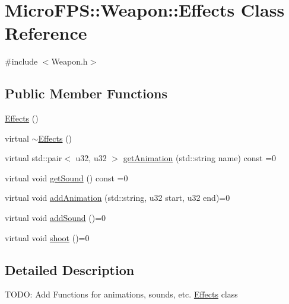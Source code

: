 \hypertarget{class_micro_f_p_s_1_1_weapon_1_1_effects}{
\section{MicroFPS::Weapon::Effects Class Reference}
\label{df/d54/class_micro_f_p_s_1_1_weapon_1_1_effects}
}


{\ttfamily \#include $<$Weapon.h$>$}

\subsection*{Public Member Functions}
\begin{DoxyCompactItemize}
\item 
\hyperlink{class_micro_f_p_s_1_1_weapon_1_1_effects_a07511011cd19c8919d20bdc7d6c48565}{Effects} ()
\item 
virtual \hyperlink{class_micro_f_p_s_1_1_weapon_1_1_effects_a55df57e8c918617e7d7b7c5630a3b9fd}{$\sim$Effects} ()
\item 
virtual std::pair$<$ u32, u32 $>$ \hyperlink{class_micro_f_p_s_1_1_weapon_1_1_effects_af9402b6042248fa3d24cb3b0b6de067f}{getAnimation} (std::string name) const =0
\item 
virtual void \hyperlink{class_micro_f_p_s_1_1_weapon_1_1_effects_ae06a99a067de9a4c0dedd4bef849e4ba}{getSound} () const =0
\item 
virtual void \hyperlink{class_micro_f_p_s_1_1_weapon_1_1_effects_ad2e59cffebe9b426b9bf41e09ed34e9a}{addAnimation} (std::string, u32 start, u32 end)=0
\item 
virtual void \hyperlink{class_micro_f_p_s_1_1_weapon_1_1_effects_ad34b86928f9dab3b0094566844fa2d9b}{addSound} ()=0
\item 
virtual void \hyperlink{class_micro_f_p_s_1_1_weapon_1_1_effects_a15c2a5e604b58301317946622c3e3c65}{shoot} ()=0
\end{DoxyCompactItemize}


\subsection{Detailed Description}
TODO: Add Functions for animations, sounds, etc. \hyperlink{class_micro_f_p_s_1_1_weapon_1_1_effects}{Effects} class 

